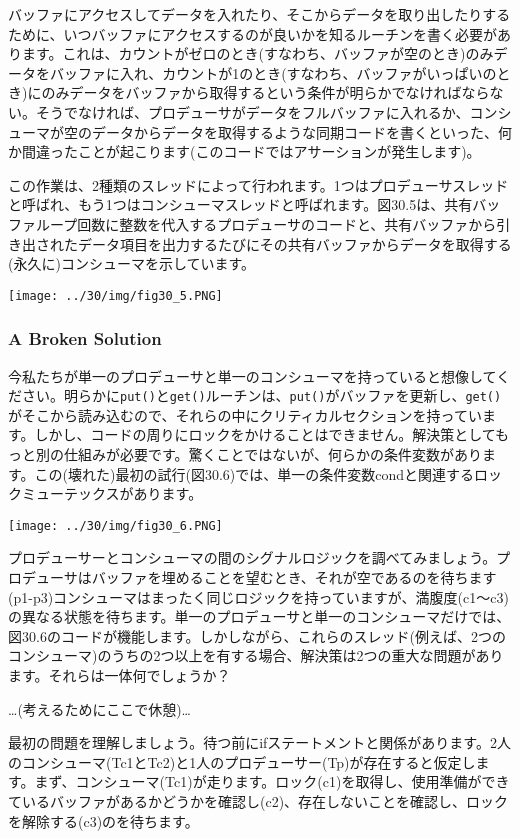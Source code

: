 バッファにアクセスしてデータを入れたり、そこからデータを取り出したりするために、いつバッファにアクセスするのが良いかを知るルーチンを書く必要があります。これは、カウントがゼロのとき(すなわち、バッファが空のとき)のみデータをバッファに入れ、カウントが1のとき(すなわち、バッファがいっぱいのとき)にのみデータをバッファから取得するという条件が明らかでなければならない。そうでなければ、プロデューサがデータをフルバッファに入れるか、コンシューマが空のデータからデータを取得するような同期コードを書くといった、何か間違ったことが起こります(このコードではアサーションが発生します)。

この作業は、2種類のスレッドによって行われます。1つはプロデューサスレッドと呼ばれ、もう1つはコンシューマスレッドと呼ばれます。図30.5は、共有バッファループ回数に整数を代入するプロデューサのコードと、共有バッファから引き出されたデータ項目を出力するたびにその共有バッファからデータを取得する(永久に)コンシューマを示しています。

\texttt{[image: ../30/img/fig30\_5.PNG]}

\hypertarget{a-broken-solution}{%
\subsubsection*{A Broken Solution}\label{a-broken-solution}}

今私たちが単一のプロデューサと単一のコンシューマを持っていると想像してください。明らかに\texttt{put()}と\texttt{get()}ルーチンは、\texttt{put()}がバッファを更新し、\texttt{get()}がそこから読み込むので、それらの中にクリティカルセクションを持っています。しかし、コードの周りにロックをかけることはできません。解決策としてもっと別の仕組みが必要です。驚くことではないが、何らかの条件変数があります。この(壊れた)最初の試行(図30.6)では、単一の条件変数condと関連するロックミューテックスがあります。

\texttt{[image: ../30/img/fig30\_6.PNG]}

プロデューサーとコンシューマの間のシグナルロジックを調べてみましょう。プロデューサはバッファを埋めることを望むとき、それが空であるのを待ちます(p1-p3)コンシューマはまったく同じロジックを持っていますが、満腹度(c1〜c3)の異なる状態を待ちます。単一のプロデューサと単一のコンシューマだけでは、図30.6のコードが機能します。しかしながら、これらのスレッド(例えば、2つのコンシューマ)のうちの2つ以上を有する場合、解決策は2つの重大な問題があります。それらは一体何でしょうか？

\ldots(考えるためにここで休憩)\ldots{}

最初の問題を理解しましょう。待つ前にifステートメントと関係があります。2人のコンシューマ(Tc1とTc2)と1人のプロデューサー(Tp)が存在すると仮定します。まず、コンシューマ(Tc1)が走ります。ロック(c1)を取得し、使用準備ができているバッファがあるかどうかを確認し(c2)、存在しないことを確認し、ロックを解除する(c3)のを待ちます。

